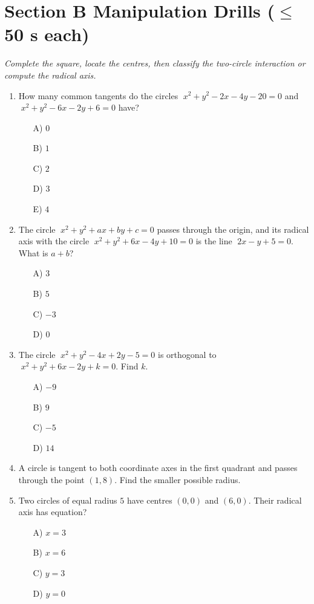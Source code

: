 \documentclass[11pt,a4paper]{article}
\begin{document}
\section*{Section B \quad Manipulation Drills \hfill{\normalfont\small($\leq$50 s each)}}

\noindent\textit{Complete the square, locate the centres, then classify the two-circle interaction or compute the radical axis.}

\begin{enumerate}

\item How many common tangents do the circles $\;x^2+y^2-2x-4y-20=0$ and $\;x^2+y^2-6x-2y+6=0$ have?
\begin{itemize}
\item[A)] $0$
\item[B)] $1$
\item[C)] $2$
\item[D)] $3$
\item[E)] $4$
\end{itemize}

\item The circle $\;x^2+y^2+ax+by+c=0$ passes through the origin, and its radical axis with the circle $\;x^2+y^2+6x-4y+10=0$ is the line $\;2x-y+5=0$. What is $a+b$?
\begin{itemize}
\item[A)] $3$
\item[B)] $5$
\item[C)] $-3$
\item[D)] $0$
\end{itemize}

\item The circle $\;x^2+y^2-4x+2y-5=0$ is orthogonal to $\;x^2+y^2+6x-2y+k=0$. Find $k$.
\begin{itemize}
\item[A)] $-9$
\item[B)] $9$
\item[C)] $-5$
\item[D)] $14$
\end{itemize}

\item A circle is tangent to both coordinate axes in the first quadrant and passes through the point $(1,8)$. Find the smaller possible radius.

\item Two circles of equal radius $5$ have centres $(0,0)$ and $(6,0)$. Their radical axis has equation?
\begin{itemize}
\item[A)] $x=3$
\item[B)] $x=6$
\item[C)] $y=3$
\item[D)] $y=0$
\end{itemize}


\end{enumerate}
\end{document}
